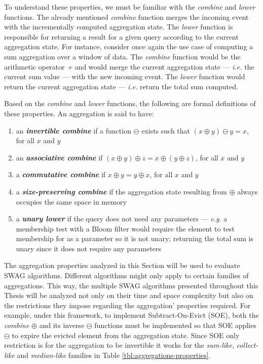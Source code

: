 To understand these properties, we must be familiar with the \textit{combine} and \textit{lower} functions. The already mentioned \textit{combine} function merges the incoming event with the incrementally computed aggregation state. The \textit{lower} function is responsible for returning a result for a given query according to the current aggregation state. For instance, consider once again the use case of computing a sum aggregation over a window of data. The \textit{combine} function would be the arithmetic operator \textit{+} and would merge the current aggregation state --- \textit{i.e.} the current sum value --- with the new incoming event. The \textit{lower} function would return the current aggregation state --- \textit{i.e.} return the total sum computed.

Based on the \textit{combine} and \textit{lower} functions, the following are formal definitions of these properties. An aggregation is said to have:

\begin{enumerate}
    \item  an \textbf{\textit{invertible combine}} if a function $\ominus$ exists such that $(x \oplus y) \ominus y = x$, for all $x$ and $y$
    
    \item  an \textbf{\textit{associative combine}} if $(x \oplus y) \oplus z = x \oplus (y \oplus z)$, for all $x$ and $y$
    
    \item  a \textbf{\textit{commutative combine}} if $x \oplus y = y \oplus x$, for all $x$ and $y$
    
    \item  a \textbf{\textit{size-preserving combine}} if the aggregation state resulting from $\oplus$ always occupies the same space in memory
   
    \item  a \textbf{\textit{unary lower}} if the query does not need any parameters --- \textit{e.g.} a membership test with a Bloom filter would require the element to test membership for as a parameter so it is not unary; returning the total sum is unary since it does not require any parameters
\end{enumerate}


The aggregation properties analyzed in this Section will be used to evaluate SWAG algorithms. Different algorithms might only apply to certain families of aggregations. This way, the multiple SWAG algorithms presented throughout this Thesis will be analyzed not only on their time and space complexity but also on the restrictions they impose regarding the aggregation' properties required. For example, under this framework, to implement Subtract-On-Evict (SOE), both the \textit{combine} $\oplus$ and its inverse $\ominus$ functions must be implemented so that SOE applies $\ominus$ to expire the evicted element from the aggregation state. Since SOE only restriction is for the aggregation to be invertible it works for the \textit{sum-like}, \textit{collect-like} and \textit{median-like} families in Table \ref{tbl:aggregations-properties}.

